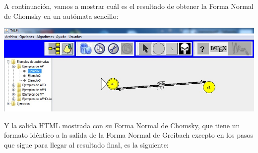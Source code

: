 \documentclass[12pt,a4paper,spanish]{book}
\begin{document}
A continuaci\'on, vamos a mostrar cu\'al es el resultado de obtener la Forma Normal de Chomsky en un aut\'omata sencillo:\\
\begin{center}
\includegraphics[width=\textwidth]{chom1.jpg}
\end{center}

Y la salida HTML mostrada con su Forma Normal de Chomsky, que tiene un formato id\'entico a la salida de la Forma Normal de Greibach excepto en los pasos que sigue para llegar al resultado final, es la siguiente:\\
\newpage
\end{document}
